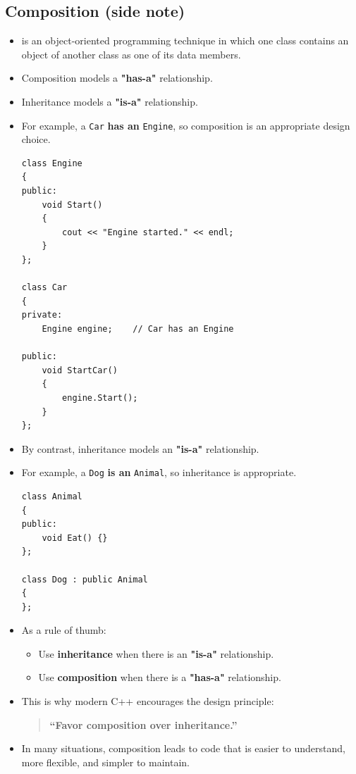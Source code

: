 \documentclass[10pt]{article}
\newcommand{\vocab}[1]{\fbox{\textbf{\textit{#1}}}}
\begin{document}
\subsection{Composition (side note)}
\begin{itemize}
    \item \vocab{Composition} is an object-oriented programming technique in which
    one class contains an object of another class as one of its data members.

    \item Composition models a \textbf{"has-a"} relationship.

	\item Inheritance models a \textbf{"is-a"} relationship.

    \item For example, a \verb|Car| \textbf{has an} \verb|Engine|, so composition
    is an appropriate design choice.

\begin{verbatim}
class Engine
{
public:
    void Start()
    {
        cout << "Engine started." << endl;
    }
};

class Car
{
private:
    Engine engine;    // Car has an Engine

public:
    void StartCar()
    {
        engine.Start();
    }
};
\end{verbatim}

    \item By contrast, inheritance models an \textbf{"is-a"} relationship.

    \item For example, a \verb|Dog| \textbf{is an} \verb|Animal|, so inheritance
    is appropriate.

\begin{verbatim}
class Animal
{
public:
    void Eat() {}
};

class Dog : public Animal
{
};
\end{verbatim}

    \item As a rule of thumb:
    \begin{itemize}
        \item Use \textbf{inheritance} when there is an \textbf{"is-a"} relationship.
        \item Use \textbf{composition} when there is a \textbf{"has-a"} relationship.
    \end{itemize}

    \item This is why modern C++ encourages the design principle:

    \begin{quote}
        \textbf{``Favor composition over inheritance.''}
    \end{quote}

    \item In many situations, composition leads to code that is easier to
    understand, more flexible, and simpler to maintain.
\end{itemize}
\end{document}
